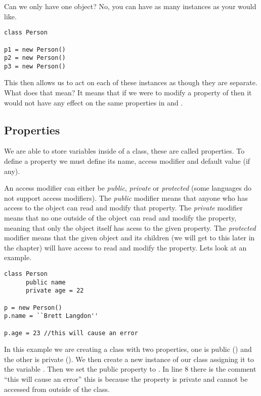 Can we only have one object?
No, you can have as many instances as your would like.
\par

\begin{lstlisting}[caption={Multiple Object Instances}]
class Person

p1 = new Person()
p2 = new Person()
p3 = new Person()
\end{lstlisting}

This then allows us to act on each of these instances as though they are separate.
What does that mean?
It means that if we were to modify a property of  then it would not have any effect on
the same properties in  and .

\subsection{Properties}
We are able to store variables inside of a class, these are called properties.
To define a property we must define its name, access modifier and default value (if any).
\par

An access modifier can either be \emph{public}, \emph{private} or \emph{protected} (some languages do not support
access modifiers).
The \emph{public} modifier means that anyone who has access to the object can read and modify that property.
The \emph{private} modifier means that no one outside of the object can read and modify the property, meaning that
only the object itself has acess to the given property.
The \emph{protected} modifier means that the given object and its children (we will get to this later in the chapter)
will have access to read and modify the property. Lets look at an example.
\par

\begin{lstlisting}[caption={Class Properties}]
class Person
      public name
      private age = 22

p = new Person()
p.name = ``Brett Langdon''

p.age = 23 //this will cause an error

\end{lstlisting}

In this example we are creating a class with two properties, one is public () and the other is private ().
We then create a new instance of our class assigning it to the variable .
Then we set the public property  to .
In line 8 there is the comment ``this will cause an error'' this is because the property  is private and cannot be accessed
from outside of the class.


